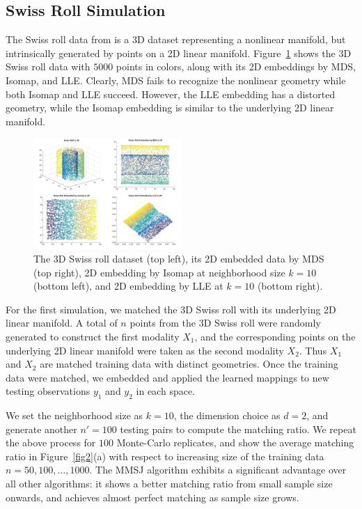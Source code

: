 \documentclass[times,twocolumn,final]{elsarticle}
\begin{document}
\subsection{Swiss Roll Simulation}
The Swiss roll data from \citep{TenenbaumSilvaLangford2000} is a 3D dataset representing a nonlinear manifold, but intrinsically generated by points on a 2D linear manifold. Figure~\ref{fig1} shows the 3D Swiss roll data with $5000$ points in colors, along with its 2D embeddings by MDS, Isomap, and LLE. Clearly, MDS fails to recognize the nonlinear geometry while both Isomap and LLE succeed. However, the LLE embedding has a distorted geometry, while the Isomap embedding is similar to the underlying 2D linear manifold.

\begin{figure}[htbp]
\centering
\includegraphics[width=0.5\textwidth]{Swiss.png}
\caption{The 3D Swiss roll dataset (top left), its 2D embedded data by MDS (top right), 2D embedding by Isomap at neighborhood size $k=10$ (bottom left), and 2D embedding by LLE at $k=10$ (bottom right).}
\label{fig1}
\end{figure}

For the first simulation, we matched the 3D Swiss roll with its underlying 2D linear manifold. A total of $n$ points from the 3D Swiss roll were randomly generated to construct the first modality $X_{1}$, and the corresponding points on the underlying 2D linear manifold were taken as the second modality $X_{2}$. Thus $X_{1}$ and $X_{2}$ are matched training data with distinct geometries. Once the training data were matched, we embedded and applied the learned mappings to new testing observations $y_{1}$ and $y_{2}$ in each space.

We set the neighborhood size as $k=10$, the dimension choice as $d=2$, and generate another $n'=100$ testing pairs to compute the matching ratio. We repeat the above process for $100$ Monte-Carlo replicates, and show the average matching ratio in Figure~\ref{fig2}(a) with respect to increasing size of the training data $n=50,100,\ldots,1000$. 
The MMSJ algorithm exhibits a significant advantage over all other algorithms: it shows a better matching ratio from small sample size onwards, and achieves almost perfect matching as sample size grows.
\end{document}
